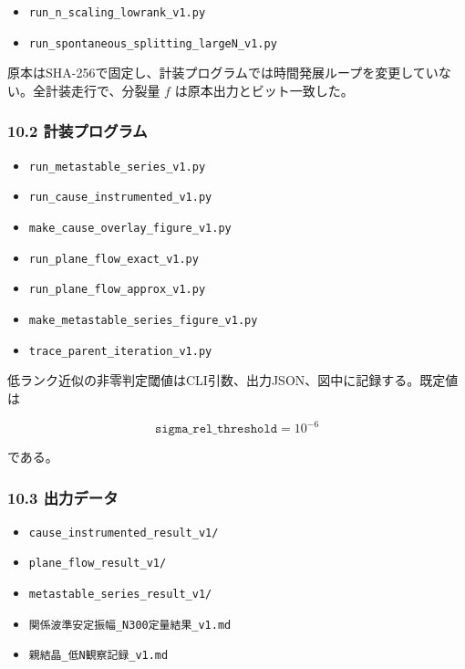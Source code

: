 \documentclass[
  a4paper,
]{ltjsarticle}
\providecommand{\tightlist}{%
  \setlength{\itemsep}{0pt}\setlength{\parskip}{0pt}}
\begin{document}
\begin{itemize}
\tightlist
\item
  \texttt{run\_n\_scaling\_lowrank\_v1.py}
\item
  \texttt{run\_spontaneous\_splitting\_largeN\_v1.py}
\end{itemize}

原本はSHA-256で固定し、計装プログラムでは時間発展ループを変更していない。全計装走行で、分裂量
\(f\) は原本出力とビット一致した。

\subsubsection{10.2
計装プログラム}\label{ux8a08ux88c5ux30d7ux30edux30b0ux30e9ux30e0}

\begin{itemize}
\tightlist
\item
  \texttt{run\_metastable\_series\_v1.py}
\item
  \texttt{run\_cause\_instrumented\_v1.py}
\item
  \texttt{make\_cause\_overlay\_figure\_v1.py}
\item
  \texttt{run\_plane\_flow\_exact\_v1.py}
\item
  \texttt{run\_plane\_flow\_approx\_v1.py}
\item
  \texttt{make\_metastable\_series\_figure\_v1.py}
\item
  \texttt{trace\_parent\_iteration\_v1.py}
\end{itemize}

低ランク近似の非零判定閾値はCLI引数、出力JSON、図中に記録する。既定値は

\[
\texttt{sigma\_rel\_threshold}=10^{-6}
\]

である。

\subsubsection{10.3 出力データ}\label{ux51faux529bux30c7ux30fcux30bf}

\begin{itemize}
\tightlist
\item
  \texttt{cause\_instrumented\_result\_v1/}
\item
  \texttt{plane\_flow\_result\_v1/}
\item
  \texttt{metastable\_series\_result\_v1/}
\item
  \texttt{関係波準安定振幅\_N300定量結果\_v1.md}
\item
  \texttt{親結晶\_低N観察記録\_v1.md}
\end{itemize}
\end{document}
